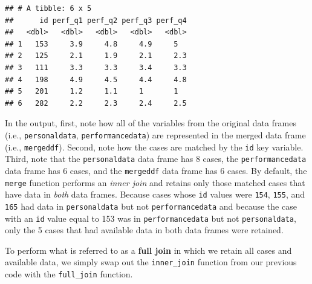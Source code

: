 \documentclass[]{book}
\newenvironment{Shaded}{\begin{snugshade}}{\end{snugshade}}
\newcommand{\KeywordTok}[1]{\textcolor[rgb]{0.13,0.29,0.53}{\textbf{#1}}}
\newcommand{\DataTypeTok}[1]{\textcolor[rgb]{0.13,0.29,0.53}{#1}}
\newcommand{\StringTok}[1]{\textcolor[rgb]{0.31,0.60,0.02}{#1}}
\newcommand{\CommentTok}[1]{\textcolor[rgb]{0.56,0.35,0.01}{\textit{#1}}}
\newcommand{\OperatorTok}[1]{\textcolor[rgb]{0.81,0.36,0.00}{\textbf{#1}}}
\newcommand{\NormalTok}[1]{#1}
\begin{document}
\begin{verbatim}
## # A tibble: 6 x 5
##      id perf_q1 perf_q2 perf_q3 perf_q4
##   <dbl>   <dbl>   <dbl>   <dbl>   <dbl>
## 1   153     3.9     4.8     4.9     5  
## 2   125     2.1     1.9     2.1     2.3
## 3   111     3.3     3.3     3.4     3.3
## 4   198     4.9     4.5     4.4     4.8
## 5   201     1.2     1.1     1       1  
## 6   282     2.2     2.3     2.4     2.5
\end{verbatim}

In the output, first, note how all of the variables from the original
data frames (i.e., \texttt{personaldata}, \texttt{performancedata}) are
represented in the merged data frame (i.e., \texttt{mergeddf}). Second,
note how the cases are matched by the \texttt{id} key variable. Third,
note that the \texttt{personaldata} data frame has 8 cases, the
\texttt{performancedata} data frame has 6 cases, and the
\texttt{mergeddf} data frame has 6 cases. By default, the \texttt{merge}
function performs an \emph{inner join} and retains only those matched
cases that have data in \emph{both} data frames. Because cases whose
\texttt{id} values were \texttt{154}, \texttt{155}, and \texttt{165} had
data in \texttt{personaldata} but not \texttt{performancedata} and
because the case with an \texttt{id} value equal to 153 was in
\texttt{performancedata} but not \texttt{personaldata}, only the 5 cases
that had available data in both data frames were retained.

To perform what is referred to as a \textbf{full join} in which we
retain all cases and available data, we simply swap out the
\texttt{inner\_join} function from our previous code with the
\texttt{full\_join} function.

\begin{Shaded}
\end{Shaded}
\end{document}
